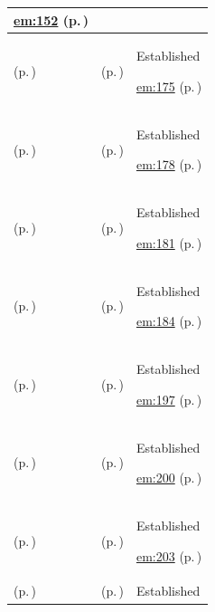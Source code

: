 \begin{longtable}{|>{\raggedright\arraybackslash}p{0.27\TableWidth}|>{\raggedright\arraybackslash}p{0.27\TableWidth}|>{\raggedright\arraybackslash}p{0.46\TableWidth}|}
 \hyperref[rad:em:140]{em:152} (p.\,\pageref{rad:em:140})\\\hline
\nameref{service:healthcare-service-directory-query} (p.\,\pageref{service:healthcare-service-directory-query}) & \nameref{feature:feat-em-24} (p.\,\pageref{feature:feat-em-24}) & Established

 \hyperref[rad:em:161]{em:175} (p.\,\pageref{rad:em:161})\\\hline
\nameref{service:service-provision-resolution} (p.\,\pageref{service:service-provision-resolution}) & \nameref{feature:feat-em-25} (p.\,\pageref{feature:feat-em-25}) & Established

 \hyperref[rad:em:161]{em:178} (p.\,\pageref{rad:em:161})\\\hline
\nameref{service:service-availability-query} (p.\,\pageref{service:service-availability-query}) & \nameref{feature:feat-em-26} (p.\,\pageref{feature:feat-em-26}) & Established

 \hyperref[rad:em:161]{em:181} (p.\,\pageref{rad:em:161})\\\hline
\nameref{service:service-eligibility-evaluation} (p.\,\pageref{service:service-eligibility-evaluation}) & \nameref{feature:feat-em-27} (p.\,\pageref{feature:feat-em-27}) & Established

 \hyperref[rad:em:161]{em:184} (p.\,\pageref{rad:em:161})\\\hline
\nameref{service:device-definition-query} (p.\,\pageref{service:device-definition-query}) & \nameref{feature:feat-em-28} (p.\,\pageref{feature:feat-em-28}) & Established

 \hyperref[rad:em:193]{em:197} (p.\,\pageref{rad:em:193})\\\hline
\nameref{service:device-instance-resolution} (p.\,\pageref{service:device-instance-resolution}) & \nameref{feature:feat-em-29} (p.\,\pageref{feature:feat-em-29}) & Established

 \hyperref[rad:em:193]{em:200} (p.\,\pageref{rad:em:193})\\\hline
\nameref{service:device-association-query} (p.\,\pageref{service:device-association-query}) & \nameref{feature:feat-em-30} (p.\,\pageref{feature:feat-em-30}) & Established

 \hyperref[rad:em:193]{em:203} (p.\,\pageref{rad:em:193})\\\hline
\nameref{service:device-endpoint-resolution} (p.\,\pageref{service:device-endpoint-resolution}) & \nameref{feature:feat-em-31} (p.\,\pageref{feature:feat-em-31}) & Established


\end{longtable}
